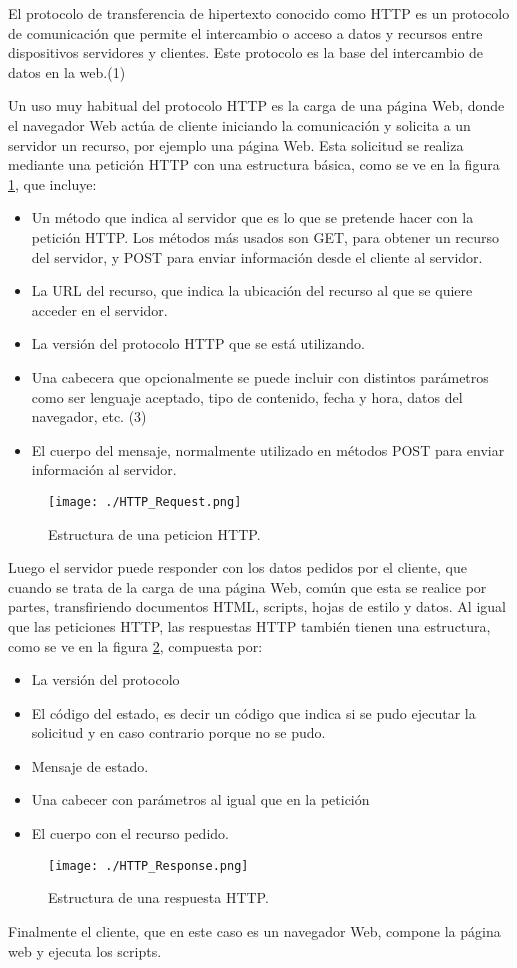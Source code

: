 El protocolo de transferencia de hipertexto conocido como HTTP es un protocolo de comunicación que permite el intercambio o acceso a datos y recursos entre dispositivos servidores y clientes. Este protocolo es la base del intercambio de datos en la web.(1)
 
Un uso muy habitual del protocolo HTTP es la carga de una página Web, donde el navegador Web actúa de cliente iniciando la comunicación y solicita a un servidor un recurso, por ejemplo una página Web. Esta solicitud se realiza mediante una petición HTTP con una estructura básica, como se ve en la figura \ref{fig:HTTP_Req}, que incluye:
\begin{itemize}
	\item Un método que indica al servidor que es lo que se pretende hacer con la petición HTTP. Los métodos más usados son GET, para obtener un recurso del servidor, y POST para enviar información desde el cliente al servidor.
	\item La URL del recurso, que indica la ubicación del recurso al que se quiere acceder en el servidor.
	\item La versión del protocolo HTTP que se está utilizando.
	\item Una cabecera que opcionalmente se puede incluir con distintos parámetros como ser lenguaje aceptado, tipo de contenido, fecha y hora, datos del navegador, etc. (3)
	\item El cuerpo del mensaje, normalmente utilizado en métodos POST para enviar información al servidor.
\end{itemize}

\begin{figure}[H]
	\centering
	\texttt{[image: ./HTTP\_Request.png]}
	\caption{Estructura de una peticion HTTP.}
	\label{fig:HTTP_Req}
\end{figure}

Luego el servidor puede responder con los datos pedidos por el cliente, que cuando se trata de la carga de una página Web, común que esta se realice por partes, transfiriendo documentos HTML, scripts, hojas de estilo y datos.
Al igual que las peticiones HTTP, las respuestas HTTP también tienen una estructura, como se ve en la figura \ref{fig:HTTP_Resp}, compuesta por:

\begin{itemize}
	\item La versión del protocolo
	\item El código del estado, es decir un código que indica si se pudo ejecutar la solicitud y en caso contrario porque no se pudo.
	\item Mensaje de estado.
	\item Una cabecer con parámetros al igual que en la petición
	\item El cuerpo con el recurso pedido.
\end{itemize}

\begin{figure}[H]
	\centering
	\texttt{[image: ./HTTP\_Response.png]}
	\caption{Estructura de una respuesta HTTP.}
	\label{fig:HTTP_Resp}
\end{figure}

Finalmente el cliente, que en este caso es un navegador Web, compone la página web y ejecuta los scripts.


